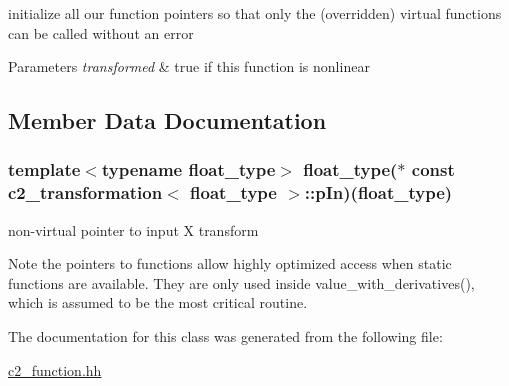 initialize all our function pointers so that only the (overridden) virtual functions can be called without an error 


\begin{DoxyParams}{Parameters}
{\em transformed} & true if this function is nonlinear \\
\hline
\end{DoxyParams}


\subsection{Member Data Documentation}
\hypertarget{classc2__transformation_a8198a729a8e5aebce14a178a4d6a0ea6}{
\subsubsection[{p\-In}]{\setlength{\rightskip}{0pt plus 5cm}template$<$typename float\-\_\-type$>$ float\-\_\-type($\ast$ const {\bf c2\-\_\-transformation}$<$ float\-\_\-type $>$\-::p\-In)(float\-\_\-type)}}\label{classc2__transformation_a8198a729a8e5aebce14a178a4d6a0ea6}


non-\/virtual pointer to input X transform 

\begin{DoxyNote}{Note}
the pointers to functions allow highly optimized access when static functions are available. They are only used inside value\-\_\-with\-\_\-derivatives(), which is assumed to be the most critical routine. 
\end{DoxyNote}


The documentation for this class was generated from the following file\-:\begin{DoxyCompactItemize}
\item 
\hyperlink{c2__function_8hh}{c2\-\_\-function.\-hh}\end{DoxyCompactItemize}
